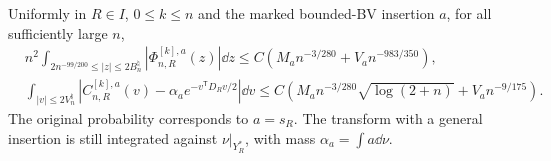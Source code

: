 \begin{theorem}
\label{thm:rate-preserving-annulus}
Uniformly in $R\in I$, $0\le k\le n$ and the marked bounded-BV
insertion $a$, for all sufficiently large $n$,
\begin{align}
 &n^2\int_{2n^{-99/200}\le|z|\le2B_n^\natural}
                     |\Phi^{[k],a}_{n,R}(z)|\dd z
       \le C\left(M_an^{-3/280}+V_an^{-983/350}\right),
       \label{eq:rate-preserving-annulus}\\
 &\int_{|v|\le2V_n^\natural}
       |C^{[k],a}_{n,R}(v)-\alpha_a e^{-v^{\mathsf T}D_Rv/2}|\dd v
       \le C\left(M_an^{-3/280}\sqrt{\log(2+n)}
                           +V_an^{-9/175}\right).
       \label{eq:rate-preserving-central}
\end{align}
The original probability corresponds to $a=s_R$. The transform with a
general insertion is still integrated against $\nu|_{Y_R^*}$, with
mass $\alpha_a=\int a\dd\nu$.
\end{theorem}
